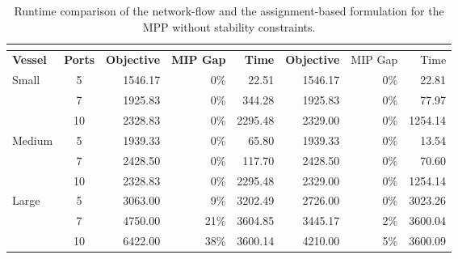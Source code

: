 \documentclass[preprint,12pt,authoryear]{elsarticle}
\begin{document}
\begin{table}[]
    \centering
    \scriptsize
    \caption{Runtime comparison of the network-flow and the assignment-based formulation for the MPP without stability constraints.}
    \label{tab:MP_simple_comparison}
    \begin{tabular}{lc|rrr|rrr}
        \multicolumn{2}{c|}{\textbf{}}           & \multicolumn{3}{c|}{\textbf{\cite{Chao2021}}}                    & \multicolumn{3}{c}{\textbf{\cite{Pacino2011FastVessels}}}   \\ \hline
        \textbf{Vessel}         & \textbf{Ports} & \textbf{Objective} & \textbf{MIP Gap} & \textbf{Time} & \textbf{Objective} & MIP Gap & Time    \\ \hline
        \multirow{3}{*}{Small}  & 5              & 1546.17            & 0\%             & 22.51         & 1546.17            & 0\%    & 22.81   \\
                                & 7              & 1925.83            & 0\%             & 344.28        & 1925.83            & 0\%    & 77.97   \\
                                & 10             & 2328.83            & 0\%             & 2295.48       & 2329.00            & 0\%    & 1254.14 \\ \hline
        \multirow{3}{*}{Medium} & 5              & 1939.33            & 0\%             & 65.80         & 1939.33            & 0\%    & 13.54   \\
                                & 7              & 2428.50            & 0\%             & 117.70        & 2428.50            & 0\%    & 70.60   \\
                                & 10             & 2328.83            & 0\%             & 2295.48       & 2329.00            & 0\%    & 1254.14 \\ \hline
        \multirow{3}{*}{Large}  & 5              & 3063.00            & 9\%             & 3202.49       & 2726.00            & 0\%    & 3023.26 \\
                                & 7              & 4750.00            & 21\%             & 3604.85       & 3445.17            & 2\%    & 3600.04 \\
                                & 10             & 6422.00            & 38\%             & 3600.14       & 4210.00            & 5\%    & 3600.09 \\ \hline
        \end{tabular}
\end{table}
\end{document}
